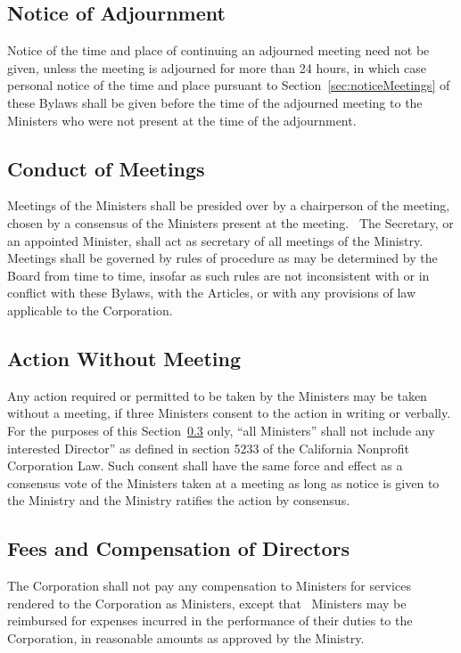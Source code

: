 \documentclass[letterpaper,titlepage]{article}
\begin{document}
\subsection{Notice of Adjournment}
Notice of the time and place of continuing an adjourned meeting need not be
given, unless the meeting is adjourned for more than 24 hours, in which case
personal notice of the time and place pursuant to
Section~\ref{sec:noticeMeetings} of these Bylaws shall be given before the time of the adjourned meeting to the Ministers who were not present at the time of the adjournment.
\subsection{Conduct of Meetings}
\label{sec:conductMeetings}
Meetings of the Ministers shall be presided over by a chairperson of the meeting, chosen by a consensus of the Ministers present at the meeting.  The Secretary, or an appointed Minister, shall act as secretary of all meetings of the Ministry.  Meetings shall be governed by rules of procedure as may be determined by the Board from time to time, insofar as such rules are not inconsistent with or in conflict with these Bylaws, with the Articles, or with any provisions of law applicable to the Corporation.
\subsection{Action Without Meeting}
\label{sec:actionWithout}
Any action required or permitted to be taken by the Ministers may be taken
without a meeting, if three Ministers consent to the action in writing or
verbally. For the purposes of this Section~\ref{sec:actionWithout} only, ``all
Ministers'' shall not include any interested Director” as defined in section 5233 of the California Nonprofit Corporation Law. Such consent shall have the same force and effect as a consensus vote of the Ministers taken at a meeting as long as notice is given to the Ministry and the Ministry ratifies the action by consensus.
\subsection{Fees and Compensation of Directors}
\label{sec:feesCompensation}
The Corporation shall not pay any compensation to Ministers for services rendered to the Corporation as Ministers, except that  Ministers may be reimbursed for expenses incurred in the performance of their duties to the Corporation, in reasonable amounts as approved by the Ministry.
\end{document}

